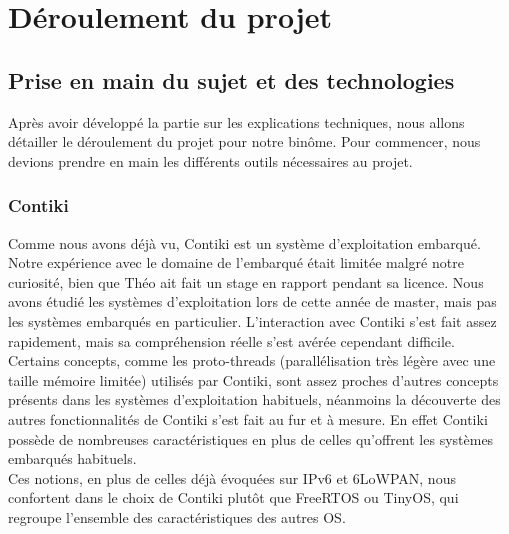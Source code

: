 \chapter{Déroulement du projet}
\label{sec:deroulement}

\section{Prise en main du sujet et des technologies}
	Après avoir développé la partie sur les explications techniques, nous allons détailler le déroulement du projet pour notre binôme. Pour commencer, nous devions prendre en main les différents outils nécessaires au projet.
	
	\subsection{Contiki}
	Comme nous avons déjà vu, Contiki est un système d'exploitation  embarqué. Notre expérience avec le domaine de l'embarqué était limitée malgré notre curiosité, bien que Théo ait fait un stage en rapport pendant sa licence. Nous avons étudié les systèmes d'exploitation lors de cette année de master, mais pas les systèmes embarqués en particulier. L'interaction avec Contiki s'est fait assez rapidement, mais sa compréhension réelle s'est avérée cependant difficile.\\
	Certains concepts, comme les proto-threads (parallélisation très légère avec une taille mémoire limitée) utilisés par Contiki, sont assez proches d'autres concepts présents dans les systèmes d'exploitation habituels, néanmoins la découverte des autres fonctionnalités de Contiki s'est fait au fur et à mesure. En effet Contiki possède de nombreuses caractéristiques en plus de celles qu'offrent les systèmes embarqués habituels.\\
	Ces notions, en plus de celles déjà évoquées sur IPv6 et 6LoWPAN, nous confortent dans le choix de Contiki plutôt que FreeRTOS ou TinyOS, qui regroupe l'ensemble des caractéristiques des autres OS.


